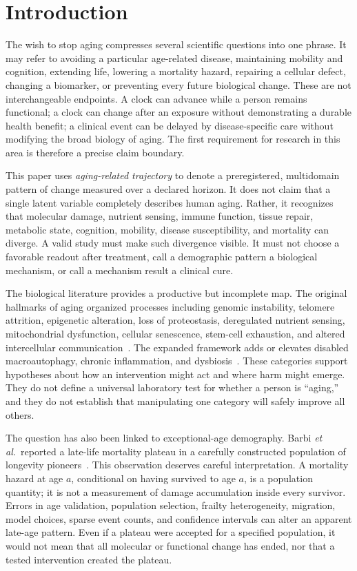 \documentclass[10pt,conference]{IEEEtran}
\begin{document}
\section{Introduction}
\label{sec:introduction}

The wish to stop aging compresses several scientific questions into one phrase. It may refer to avoiding a particular age-related disease, maintaining mobility and cognition, extending life, lowering a mortality hazard, repairing a cellular defect, changing a biomarker, or preventing every future biological change. These are not interchangeable endpoints. A clock can advance while a person remains functional; a clock can change after an exposure without demonstrating a durable health benefit; a clinical event can be delayed by disease-specific care without modifying the broad biology of aging. The first requirement for research in this area is therefore a precise claim boundary.

This paper uses \emph{aging-related trajectory} to denote a preregistered, multidomain pattern of change measured over a declared horizon. It does not claim that a single latent variable completely describes human aging. Rather, it recognizes that molecular damage, nutrient sensing, immune function, tissue repair, metabolic state, cognition, mobility, disease susceptibility, and mortality can diverge. A valid study must make such divergence visible. It must not choose a favorable readout after treatment, call a demographic pattern a biological mechanism, or call a mechanism result a clinical cure.

The biological literature provides a productive but incomplete map. The original hallmarks of aging organized processes including genomic instability, telomere attrition, epigenetic alteration, loss of proteostasis, deregulated nutrient sensing, mitochondrial dysfunction, cellular senescence, stem-cell exhaustion, and altered intercellular communication~\cite{lopez2013}. The expanded framework adds or elevates disabled macroautophagy, chronic inflammation, and dysbiosis~\cite{lopez2023}. These categories support hypotheses about how an intervention might act and where harm might emerge. They do not define a universal laboratory test for whether a person is ``aging,'' and they do not establish that manipulating one category will safely improve all others.

The question has also been linked to exceptional-age demography. Barbi \emph{et al.}\ reported a late-life mortality plateau in a carefully constructed population of longevity pioneers~\cite{barbi2018}. This observation deserves careful interpretation. A mortality hazard at age $a$, conditional on having survived to age $a$, is a population quantity; it is not a measurement of damage accumulation inside every survivor. Errors in age validation, population selection, frailty heterogeneity, migration, model choices, sparse event counts, and confidence intervals can alter an apparent late-age pattern. Even if a plateau were accepted for a specified population, it would not mean that all molecular or functional change has ended, nor that a tested intervention created the plateau.
\end{document}
